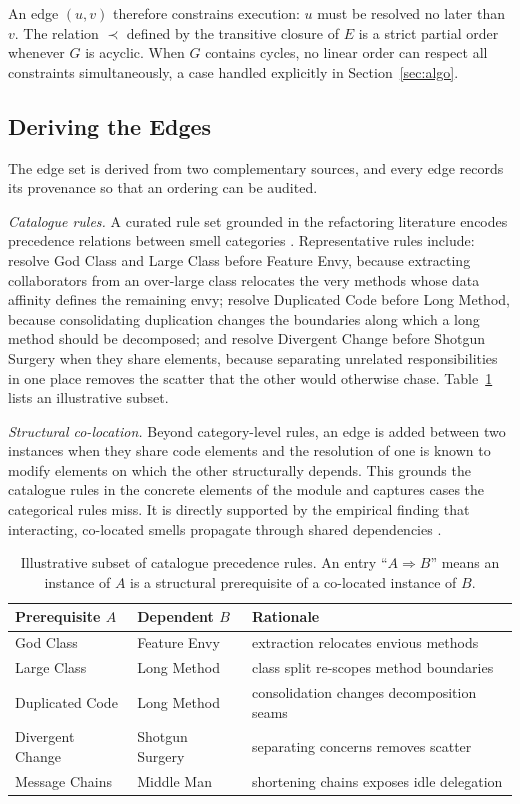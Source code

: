 \documentclass[journal,onecolumn,11pt]{IEEEtran}
\begin{document}
An edge $(u,v)$ therefore constrains execution: $u$ must be resolved no later than $v$. The relation $\prec$ defined by the transitive closure of $E$ is a strict partial order whenever $G$ is acyclic. When $G$ contains cycles, no linear order can respect all constraints simultaneously, a case handled explicitly in Section~\ref{sec:algo}.

\subsection{Deriving the Edges}
The edge set is derived from two complementary sources, and every edge records its provenance so that an ordering can be audited.

\emph{Catalogue rules.} A curated rule set grounded in the refactoring literature encodes precedence relations between smell categories \cite{fowler2018}. Representative rules include: resolve God Class and Large Class before Feature Envy, because extracting collaborators from an over-large class relocates the very methods whose data affinity defines the remaining envy; resolve Duplicated Code before Long Method, because consolidating duplication changes the boundaries along which a long method should be decomposed; and resolve Divergent Change before Shotgun Surgery when they share elements, because separating unrelated responsibilities in one place removes the scatter that the other would otherwise chase. Table~\ref{tab:rules} lists an illustrative subset.

\emph{Structural co-location.} Beyond category-level rules, an edge is added between two instances when they share code elements and the resolution of one is known to modify elements on which the other structurally depends. This grounds the catalogue rules in the concrete elements of the module and captures cases the categorical rules miss. It is directly supported by the empirical finding that interacting, co-located smells propagate through shared dependencies \cite{yamashita2013,palomba2015}.

\begin{table}[t]
\centering
\caption{Illustrative subset of catalogue precedence rules. An entry ``$A \Rightarrow B$'' means an instance of $A$ is a structural prerequisite of a co-located instance of $B$.}
\label{tab:rules}
\begin{tabular}{@{}lll@{}}
\toprule
Prerequisite $A$ & Dependent $B$ & Rationale \\
\midrule
God Class        & Feature Envy   & extraction relocates envious methods \\
Large Class      & Long Method    & class split re-scopes method boundaries \\
Duplicated Code  & Long Method    & consolidation changes decomposition seams \\
Divergent Change & Shotgun Surgery& separating concerns removes scatter \\
Message Chains   & Middle Man     & shortening chains exposes idle delegation \\
\bottomrule
\end{tabular}
\end{table}
\end{document}
